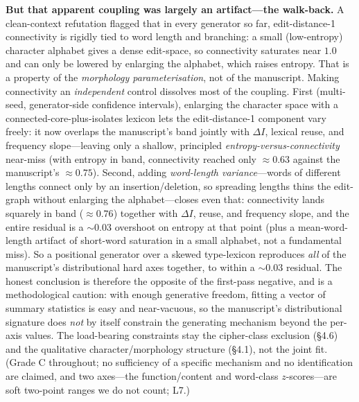 \documentclass[11pt]{article}
\begin{document}
\textbf{But that apparent coupling was largely an artifact---the walk-back.} A clean-context
refutation flagged that in every generator so far, edit-distance-1 connectivity is rigidly
tied to word length and branching: a small (low-entropy) character alphabet gives a dense
edit-space, so connectivity saturates near $1.0$ and can only be lowered by enlarging the
alphabet, which raises entropy. That is a property of the \emph{morphology
parameterisation}, not of the manuscript. Making connectivity an \emph{independent} control
dissolves most of the coupling. First (multi-seed, generator-side confidence intervals),
enlarging the character space with a connected-core-plus-isolates lexicon lets the
edit-distance-1 component vary freely: it now overlaps the manuscript's band jointly with
$\Delta I$, lexical reuse, and frequency slope---leaving only a shallow, principled
\emph{entropy-versus-connectivity} near-miss (with entropy in band, connectivity reached
only $\approx 0.63$ against the manuscript's $\approx 0.75$). Second, adding \emph{word-length
variance}---words of different lengths connect only by an insertion/deletion, so spreading
lengths thins the edit-graph without enlarging the alphabet---closes even that: connectivity
lands squarely in band ($\approx 0.76$) together with $\Delta I$, reuse, and frequency slope,
and the entire residual is a $\sim\!0.03$ overshoot on entropy at that point (plus a
mean-word-length artifact of short-word saturation in a small alphabet, not a fundamental
miss). So a positional generator over a skewed type-lexicon reproduces \emph{all} of the
manuscript's distributional hard axes together, to within a $\sim\!0.03$ residual. The honest
conclusion is therefore the opposite of the first-pass negative, and is a methodological
caution: with enough generative freedom, fitting a vector of summary statistics is easy and
near-vacuous, so the manuscript's distributional signature does \emph{not} by itself
constrain the generating mechanism beyond the per-axis values. The load-bearing constraints
stay the cipher-class exclusion (\S4.6) and the qualitative character/morphology structure
(\S4.1), not the joint fit. (Grade C throughout; no sufficiency of a specific mechanism and
no identification are claimed, and two axes---the function/content and word-class
$z$-scores---are soft two-point ranges we do not count; L7.)
\end{document}
